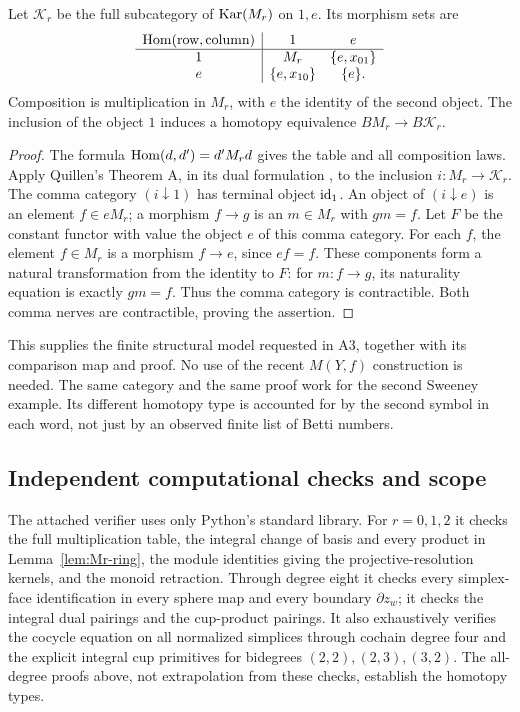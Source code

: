 \begin{proposition}\label{prop:Mr-Karoubi}
Let $\mathcal K_r$ be the full subcategory of $\operatorname{Kar}(M_r)$ on $1,e$.
Its morphism sets are
\[
 \begin{array}{c|cc}
  \operatorname{Hom}(\text{row},\text{column})&1&e\\\hline
  1&M_r&\{e,x_{01}\}\\
  e&\{e,x_{10}\}&\{e\}.
 \end{array}
\]
Composition is multiplication in $M_r$, with $e$ the identity of the
second object.  The inclusion of the object $1$ induces a homotopy
equivalence $BM_r\to B\mathcal K_r$.
\end{proposition}
\begin{proof}
The formula $\operatorname{Hom}(d,d')=d'M_rd$ gives the table and all composition
laws.  Apply Quillen's Theorem A, in its dual formulation
\cite[p.~93]{Quillen1973}, to the inclusion $i:M_r\to\mathcal K_r$.
The comma category $(i\downarrow1)$ has terminal object $\mathrm{id}_1$.
An object of $(i\downarrow e)$ is an element $f\in eM_r$; a morphism
$f\to g$ is an $m\in M_r$ with $gm=f$.  Let $F$ be the constant
functor with value the object $e$ of this comma category.  For each
$f$, the element $f\in M_r$ is a morphism $f\to e$, since $ef=f$.
These components form a natural transformation from the identity to
$F$: for $m:f\to g$, its naturality equation is exactly $gm=f$.
Thus the comma category is contractible.  Both comma nerves are
contractible, proving the assertion.
\end{proof}

This supplies the finite structural model requested in A3, together
with its comparison map and proof.  No use of the recent
$M(Y,f)$ construction is needed.  The same category and the same proof
work for the second Sweeney example.  Its different homotopy type is
accounted for by the second symbol in each word, not just by an
observed finite list of Betti numbers.

\subsection{Independent computational checks and scope}

The attached verifier uses only Python's standard library.  For
$r=0,1,2$ it checks the full multiplication table, the integral change
of basis and every product in Lemma~\ref{lem:Mr-ring}, the module
identities giving the projective-resolution kernels, and the monoid
retraction.  Through degree eight it checks every simplex-face
identification in every sphere map and every boundary $\partial z_w$;
it checks the integral dual pairings and the cup-product pairings.
It also exhaustively verifies the cocycle equation on all normalized
simplices through cochain degree four and the explicit integral
cup primitives for bidegrees $(2,2),(2,3),(3,2)$.
The all-degree proofs above,
not extrapolation from these checks, establish the homotopy types.
